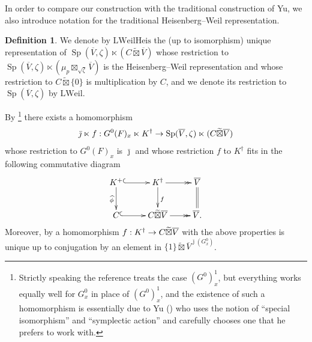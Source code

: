 \documentclass{article}
\def\ol#1{\overline{#1}}
\def\hat{\widehat}
\DeclareMathOperator{\Sp}{Sp}
\theoremstyle{definition}
\newtheorem{dfn}[thm]{Definition}
\numberwithin{equation}{subsection}
\renewcommand{\-}{\hyp{}}
\begin{document}
In order to compare our construction with the traditional construction of Yu, we also introduce notation for the traditional Heisenberg--Weil representation.

\begin{dfn}
	We denote by $\mathrm{LWeilHeis}$ the (up to isomorphism) unique representation of $\Sp(\ol{V}, \zeta) \ltimes (C \widetilde{\boxtimes} \ol{V})$ whose restriction to $\Sp(\ol{V}, \zeta) \ltimes (\mu_p \boxtimes_{\sqrt{\zeta}} \ol{V})$ is the Heisenberg--Weil representation and whose restriction to $C \widetilde{\boxtimes} \{0\}$ is multiplication by $C$, and we denote its restriction to $\Sp(\ol{V}, \zeta)$ by $\mathrm{LWeil}$.
\end{dfn}

By \cite[Lemma~3.6.5]{DF}\footnote{Strictly speaking the reference treats the case $(G^0)^1_x$, but everything works equally well for $G^0_x$ in place of $(G^0)^1_x$, and the existence of such a homomorphism is essentially due to Yu (\cite{Yu01}) who uses the notion of ``special isomorphism'' and ``symplectic action'' and carefully chooses one that he prefers to work with.} there exists a homomorphism 
\[\bar \jmath \ltimes f: G^0(F)_x \ltimes K^\dagger \ra \Sp(\ol{V}, \zeta) \ltimes(C \widetilde{\boxtimes} \ol{V})\]
whose restriction to $G^0(F)_x$ is $\bar \jmath$ and whose restriction $f$ to $K^\dagger$ fits in the following commutative diagram
\[\xymatrix{
	K^+ \ar[d]_{\hat \phi} \ar@{^{(}->}[r] & K^\dagger \ar@{->>}[r] \ar[d]^{f} & \ol{V} \ar@{=}[d]\\
	C \ar@{^{(}->}[r] & C \widetilde{\boxtimes} \ol{V} \ar@{->>}[r] & \ol{V} .}\]
Moreover, by \cite[Lemma~3.6.5]{DF} a homomorphism $f: K^\dagger \ra C \widetilde{\boxtimes} \ol{V}$ with the above properties is unique up to conjugation by an element in $\{1 \} \widetilde{\boxtimes} \ol{V}^{\bar\jmath (G^0_x)}$.
\end{document}
